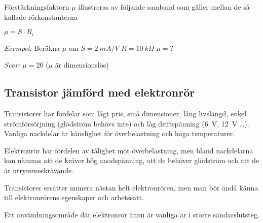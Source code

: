 Förstärkningsfaktorn \(\mu \) illustreras av följande samband som gäller mellan
de så kallade rörkonstanterna

\(\mu = S \cdot R_i\)

\emph{Exempel:}
Beräkna \(\mu\)  om \(S = 2\ mA/V\) \(R = 10\ k\Omega\) \(\mu = ?\)

\emph{Svar:} \(\mu = 20\) (\(\mu\)  är dimensionslös)

\subsection{Transistor jämförd med elektronrör}

Transistorer har fördelar som lågt pris, små dimensioner, lång livslängd, enkel
strömförsörjning (glödström behövs inte) och låg driftspänning (6~V, 12~V
\ldots ). Vanliga nackdelar är känslighet för överbelastning och höga
temperaturer.

Elektronrör har fördelen av tålighet mot överbelastning, men bland nackdelarna
kan nämnas att de kräver hög anodspänning, att de behöver glödström och att de
är utrymmeskrävande.

Transistorer ersätter numera nästan helt elektronrören, men man bör ändå känna
till elektronrörens egenskaper och arbetssätt.

Ett användningsområde där elektronrör ännu är vanliga är i större
sändarslutsteg.
